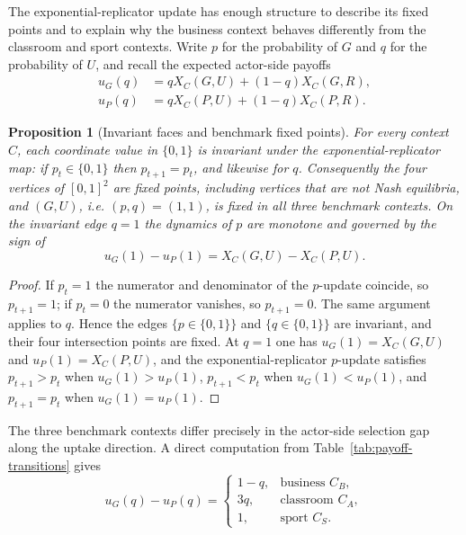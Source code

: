 \documentclass[a4paper,fleqn]{cas-dc}
\newtheorem{proposition}[definition]{Proposition}
\theoremstyle{remark}
\begin{document}
The exponential-replicator update has enough structure to describe its fixed points and to explain why the business context behaves differently from the classroom and sport contexts. Write $p$ for the probability of $G$ and $q$ for the probability of $U$, and recall the expected actor-side payoffs
\begin{align*}
u_G(q)&=qX_C(G,U)+(1-q)X_C(G,R),\\
u_P(q)&=qX_C(P,U)+(1-q)X_C(P,R).
\end{align*}

\begin{proposition}[Invariant faces and benchmark fixed points]
\label{prop:fixed-points}
For every context $C$, each coordinate value in $\{0,1\}$ is invariant under the exponential-replicator map: if $p_t\in\{0,1\}$ then $p_{t+1}=p_t$, and likewise for $q$. Consequently the four vertices of $[0,1]^2$ are fixed points, including vertices that are not Nash equilibria, and $(G,U)$, i.e. $(p,q)=(1,1)$, is fixed in all three benchmark contexts. On the invariant edge $q=1$ the dynamics of $p$ are monotone and governed by the sign of
\[
u_G(1)-u_P(1)=X_C(G,U)-X_C(P,U).
\]
\end{proposition}

\begin{proof}
If $p_t=1$ the numerator and denominator of the $p$-update coincide, so $p_{t+1}=1$; if $p_t=0$ the numerator vanishes, so $p_{t+1}=0$. The same argument applies to $q$. Hence the edges $\{p\in\{0,1\}\}$ and $\{q\in\{0,1\}\}$ are invariant, and their four intersection points are fixed. At $q=1$ one has $u_G(1)=X_C(G,U)$ and $u_P(1)=X_C(P,U)$, and the exponential-replicator $p$-update satisfies $p_{t+1}>p_t$ when $u_G(1)>u_P(1)$, $p_{t+1}<p_t$ when $u_G(1)<u_P(1)$, and $p_{t+1}=p_t$ when $u_G(1)=u_P(1)$.
\end{proof}

The three benchmark contexts differ precisely in the actor-side selection gap along the uptake direction. A direct computation from Table~\ref{tab:payoff-transitions} gives
\[
u_G(q)-u_P(q)=
\begin{cases}
1-q, & \text{business } C_B,\\
3q, & \text{classroom } C_A,\\
1, & \text{sport } C_S.
\end{cases}
\]
\end{document}
